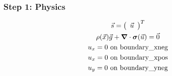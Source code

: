 \documentclass[aspectratio=169]{beamer}
\begin{document}
\begin{frame}
  \frametitle{Step 1: Physics}
  \summary{}

  \begin{minipage}{0.3\textwidth}
    {\scriptsize
    \begin{gather*}
    \vec{s} = \left(\begin{array}{c} \vec{u} \end{array}\right)^T \\
    \rho(\vec{x}) \vec{g} + \bm{\nabla} \cdot \bm{\sigma}(\vec{u}) = \vec{0} \\
    u_x = 0 \text{ on boundary\_xneg} \\
    u_x = 0 \text{ on boundary\_xpos} \\
    u_y = 0 \text{ on boundary\_yneg} \\
    \end{gather*}}
  \end{minipage}
  \hfill
  \begin{minipage}{0.67\textwidth}
  \end{minipage}
      
\end{frame}
\end{document}
